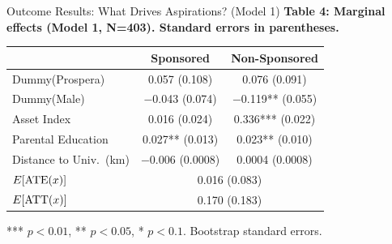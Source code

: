 \documentclass[aspectratio=169, 10pt]{beamer}
\begin{document}
\begin{frame}{Outcome Results: What Drives Aspirations? (Model 1)}
  \textbf{Table 4: Marginal effects (Model 1, N=403). Standard errors in parentheses.}
  \begin{center}
  \small
  \begin{tabular}{lcc}
    \toprule
    & \textbf{Sponsored} & \textbf{Non-Sponsored} \\
    \midrule
    Dummy(Prospera)            & 0.057 (0.108)   & 0.076 (0.091)    \\
    Dummy(Male)                & $-$0.043 (0.074)  & $-$0.119** (0.055) \\
    Asset Index                & 0.016 (0.024)   & 0.336*** (0.022) \\
    Parental Education         & 0.027** (0.013) & 0.023** (0.010)  \\
    Distance to Univ.\ (km)   & $-$0.006 (0.0008) & 0.0004 (0.0008)  \\
    \midrule
    $E[\mathrm{ATE}(x)]$               & \multicolumn{2}{c}{0.016 \quad (0.083)} \\
    $E[\mathrm{ATT}(x)]$               & \multicolumn{2}{c}{0.170 \quad (0.183)} \\
    \bottomrule
  \end{tabular}
  \end{center}
  \vspace{0.2em}
  \begin{small}*** $p{<}0.01$, ** $p{<}0.05$, * $p{<}0.1$. Bootstrap standard errors.\end{small}
\end{frame}
\end{document}

